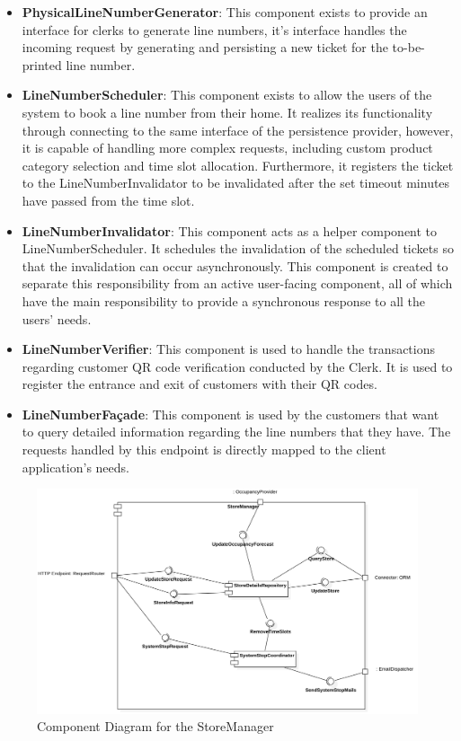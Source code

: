 \begin{itemize}
    \item \textbf{PhysicalLineNumberGenerator}: This component exists to provide an interface for clerks to generate line numbers, it's interface handles the incoming request by generating and persisting a new ticket for the to-be-printed line number.
    \item \textbf{LineNumberScheduler}: This component exists to allow the users of the system to book a line number from their home.
    It realizes its functionality through connecting to the same interface of the persistence provider, however, it is capable of handling more complex requests, including custom product category selection and time slot allocation.
    Furthermore, it registers the ticket to the LineNumberInvalidator to be invalidated after the set timeout minutes have passed from the time slot.
    \item \textbf{LineNumberInvalidator}: This component acts as a helper component to LineNumberScheduler.
    It schedules the invalidation of the scheduled tickets so that the invalidation can occur asynchronously.
    This component is created to separate this responsibility from an active user-facing component, all of which have the main responsibility to provide a synchronous response to all the users' needs.
    \item \textbf{LineNumberVerifier}: This component is used to handle the transactions regarding customer QR code verification conducted by the Clerk.
    It is used to register the entrance and exit of customers with their QR codes.
    \item \textbf{LineNumberFa\c{c}ade}: This component is used by the customers that want to query detailed information regarding the line numbers that they have.
    The requests handled by this endpoint is directly mapped to the client application's needs.

\end{itemize}
\begin{figure}[H]
    \centering
    \includegraphics[height=0.4\textwidth]{Images/ComponentDiagrams/StoreManager.png}
    \caption{Component Diagram for the StoreManager}
    \label{fig:CDStoreManager}
\end{figure}
